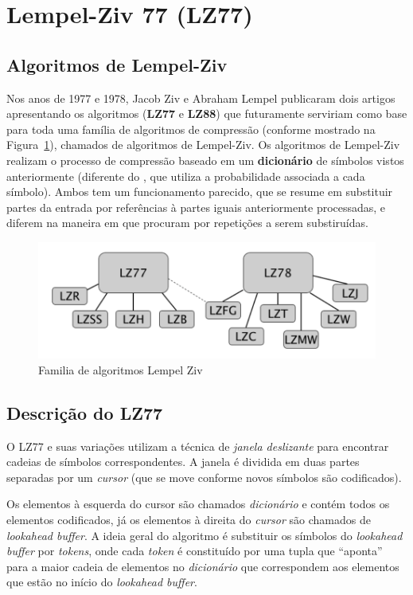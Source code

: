 \section{Lempel-Ziv 77 (LZ77)}

\subsection{Algoritmos de Lempel-Ziv}
Nos anos de 1977 e 1978, Jacob Ziv e Abraham Lempel publicaram dois artigos apresentando os algoritmos (\textbf{LZ77} e \textbf{LZ88}) que futuramente serviriam como base para toda uma família de algoritmos de compressão (conforme mostrado na Figura~\ref{fig:lz77}), chamados de algoritmos de Lempel-Ziv.
Os algoritmos de Lempel-Ziv realizam o processo de compressão baseado em um \textbf{dicionário} de símbolos vistos anteriormente (diferente do , que utiliza a probabilidade associada a cada símbolo). 
Ambos tem um funcionamento parecido, que se resume em substituir partes da entrada por referências à partes iguais anteriormente processadas, e diferem na maneira em que procuram por repetições a serem substiruídas. 

\begin{figure}[h]
   \centering
   \includegraphics[scale=0.75]{figs/lz77fam.png}
    \caption{Familia de algoritmos Lempel Ziv}
    \label{fig:lz77}
 \end{figure}

\subsection{Descrição do LZ77}
O LZ77 e suas variações utilizam a técnica de \emph{janela deslizante} para encontrar cadeias de símbolos correspondentes. 
A janela é dividida em duas partes separadas por um \emph{cursor} (que se move conforme novos símbolos são codificados).

Os elementos à esquerda do cursor são chamados \emph{dicionário} e contém todos os elementos codificados, já os elementos à direita do \emph{cursor} são chamados de \emph{lookahead buffer}.
A ideia geral do algoritmo é substituir os símbolos do \emph{lookahead buffer} por \emph{tokens}, onde cada \emph{token} é constituído por uma tupla que ``aponta'' para a maior cadeia de elementos no \emph{dicionário} que correspondem aos elementos que estão no início do \emph{lookahead buffer}.

